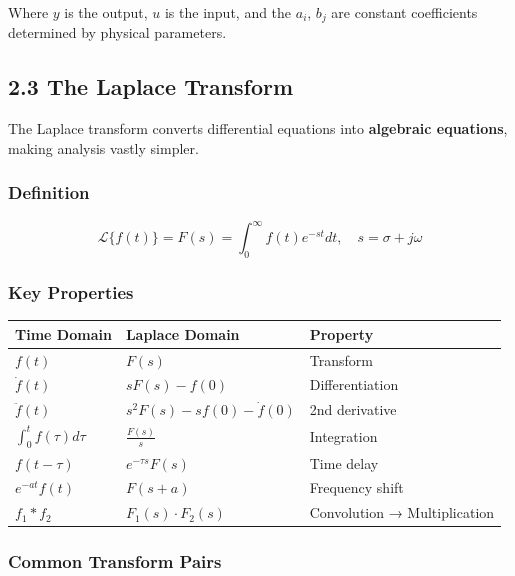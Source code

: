 \documentclass[11pt,a4paper]{book}
\begin{document}
Where $y$ is the output, $u$ is the input, and the $a_i$, $b_j$ are constant coefficients determined by physical parameters.

\medskip\noindent\hrulefill\medskip

\subsection{2.3 The Laplace Transform}

The Laplace transform converts differential equations into \textbf{algebraic equations}, making analysis vastly simpler.

\subsubsection{Definition}

\[\mathcal{L}\{f(t)\} = F(s) = \int_0^{\infty} f(t) e^{-st} dt, \quad s = \sigma + j\omega\]

\subsubsection{Key Properties}

\begin{center}
\begin{tabular}{|l|l|l|}
\hline
Time Domain & Laplace Domain & Property \\
\hline
$f(t)$ & $F(s)$ & Transform \\
$\dot{f}(t)$ & $sF(s) - f(0)$ & Differentiation \\
$\ddot{f}(t)$ & $s^2F(s) - sf(0) - \dot{f}(0)$ & 2nd derivative \\
$\int_0^t f(\tau)d\tau$ & $\frac{F(s)}{s}$ & Integration \\
$f(t-\tau)$ & $e^{-\tau s}F(s)$ & Time delay \\
$e^{-at}f(t)$ & $F(s+a)$ & Frequency shift \\
$f_1 * f_2$ & $F_1(s) \cdot F_2(s)$ & Convolution → Multiplication \\
\hline
\end{tabular}
\end{center}

\subsubsection{Common Transform Pairs}
\end{document}
